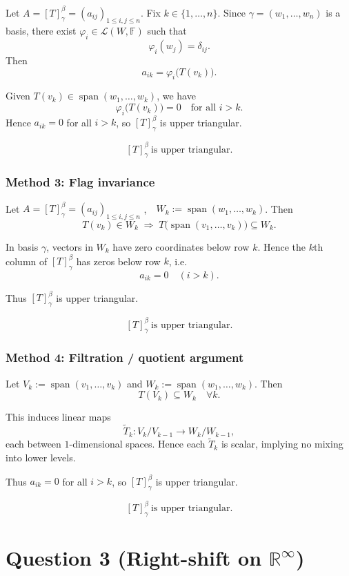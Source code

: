 \documentclass[12pt]{article}
\newcommand{\R}{\mathbb{R}}
\newcommand{\F}{\mathbb{F}}
\newcommand{\cL}{\mathcal{L}}
\newcommand{\Span}{\operatorname{span}}
\begin{document}
Let $A=[T]_{\gamma}^{\beta}=(a_{ij})_{1\le i,j\le n}$. Fix $k \in \{1,\dots,n\}$. 
Since $\gamma=(w_1,\dots,w_n)$ is a basis, there exist $\varphi_i \in \cL(W,\F)$ such that
\[
\varphi_i(w_j)=\delta_{ij}.
\]
Then
\[
a_{ik}=\varphi_i\bigl(T(v_k)\bigr).
\]

Given $T(v_k)\in \Span(w_1,\dots,w_k)$, we have
\[
\varphi_i\bigl(T(v_k)\bigr)=0 \quad \text{for all } i>k.
\]
Hence $a_{ik}=0$ for all $i>k$, so $[T]_{\gamma}^{\beta}$ is upper triangular.

\[
\boxed{\, [T]_{\gamma}^{\beta}\ \text{is upper triangular.}\,}
\]
\bigskip
\subsubsection{Method 3: Flag invariance}

Let $A=[T]_{\gamma}^{\beta}=(a_{ij})_{1\le i,j\le n}$ ,$\quad W_k:=\Span(w_1,\dots,w_k)$. Then
\[
T(v_k)\in W_k \;\Longrightarrow\; T\bigl(\Span(v_1,\dots,v_k)\bigr)\subseteq W_k.
\]

In basis $\gamma$, vectors in $W_k$ have zero coordinates below row $k$. Hence the $k$th column of $[T]_{\gamma}^{\beta}$ has zeros below row $k$, i.e.
\[
a_{ik}=0 \quad (i>k).
\]

Thus $[T]_{\gamma}^{\beta}$ is upper triangular.

\[
\boxed{\, [T]_{\gamma}^{\beta}\ \text{is upper triangular.}\,}
\]

\bigskip
\subsubsection{Method 4: Filtration / quotient argument}

Let $V_k:=\Span(v_1,\dots,v_k)$ and $W_k:=\Span(w_1,\dots,w_k)$. Then
\[
T(V_k)\subseteq W_k \quad \forall k.
\]

This induces linear maps
\[
\widetilde{T}_k : V_k/V_{k-1} \to W_k/W_{k-1},
\]
each between $1$-dimensional spaces. Hence each $\widetilde{T}_k$ is scalar, implying no mixing into lower levels.

Thus $a_{ik}=0$ for all $i>k$, so $[T]_{\gamma}^{\beta}$ is upper triangular.

\[
\boxed{\, [T]_{\gamma}^{\beta}\ \text{is upper triangular.}\,}
\]
\newpage
\section{Question 3 (Right-shift on $\R^\infty$)}
\end{document}
